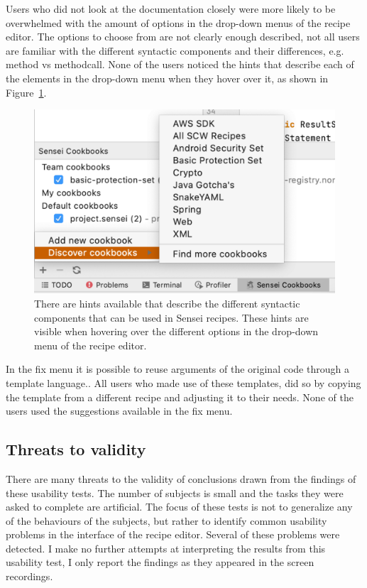Users who did not look at the documentation closely were more likely to be overwhelmed with the amount of options in the drop-down menus of the recipe editor.
The options to choose from are not clearly enough described, not all users are familiar with the different syntactic components and their differences, e.g. method vs methodcall.
None of the users noticed the hints that describe each of the elements in the drop-down menu when they hover over it, as shown in Figure~\ref{fig:dropdownhint}.

\begin{figure}
  \centering
  \includegraphics[width=\textwidth,page=6]{04-tools/figures/figures1.pdf}
  \caption[Hints for different syntactic components in the recipe editor]{There are hints available that describe the different syntactic components that can be used in Sensei recipes. These hints are visible when hovering over the different options in the drop-down menu of the recipe editor.}
  \label{fig:dropdownhint} 
\end{figure}

In the fix menu it is possible to reuse arguments of the original code through a template language..
All users who made use of these templates, did so by copying the template from a different recipe and adjusting it to their needs.
None of the users used the suggestions available in the fix menu.

\subsection{Threats to validity}
There are many threats to the validity of conclusions drawn from the findings of these usability tests.
The number of subjects is small and the tasks they were asked to complete are artificial.
The focus of these tests is not to generalize any of the behaviours of the subjects, but rather to identify common usability problems in the interface of the recipe editor.
Several of these problems were detected.
I make no further attempts at interpreting the results from this usability test, I only report the findings as they appeared in the screen recordings.